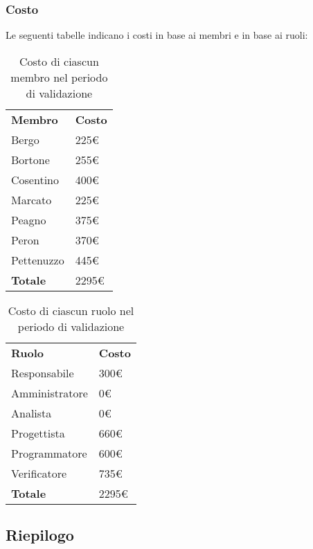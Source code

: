 	\subsubsection{Costo}
		Le seguenti tabelle indicano i costi in base ai membri e in base ai ruoli:
		\begin{table}[h]
			\centering
			\begin{tabular}{| l | l |}
				\rowcolor{LightBlue}
				\textbf{\color{white}Membro}
				& \textbf{\color{white}Costo}\\
				
				Bergo				& 225€\\
				Bortone			& 255€\\
				Cosentino		& 400€\\
				Marcato			& 225€\\
				Peagno				& 375€\\
				Peron				& 370€\\
				Pettenuzzo		& 445€\\ \hline
				\textbf{Totale} & 2295€\\ \hline
			\end{tabular}
			\caption{Costo di ciascun membro nel periodo di validazione}
		\end{table}
		
		\begin{table}[h]
			\centering
			\begin{tabular}{| l | l |}
				\rowcolor{LightBlue}
				\textbf{\color{white}Ruolo}
				& \textbf{\color{white}Costo}\\
				
				Responsabile 		& 300€\\
				Amministratore 	& 0€\\
				Analista 				& 0€\\			
				Progettista 			& 660€\\
				Programmatore 		& 600€\\
				Verificatore 		& 735€\\ \hline
				\textbf{Totale} 	& 2295€\\ \hline
			\end{tabular}		
			\caption{Costo di ciascun ruolo nel periodo di validazione}
		\end{table}

\newpage
\subsection{Riepilogo}
